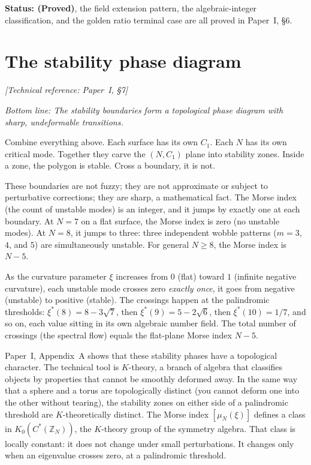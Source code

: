 \textbf{Status: (Proved)}, the field extension pattern, the
algebraic-integer classification, and the golden ratio terminal case
are all proved in Paper~I, \S6.


\section{The stability phase diagram}
\noindent\textit{[Technical reference: Paper~I, \S7]}

\medskip

\noindent\textit{Bottom line: The stability boundaries form a
topological phase diagram with sharp, undeformable transitions.}

\medskip

Combine everything above. Each surface has its own $C_1$. Each $N$
has its own critical mode. Together they carve the $(N, C_1)$ plane
into stability zones. Inside a zone, the polygon is stable. Cross a
boundary, it is not.

These boundaries are not fuzzy; they are not approximate or subject
to perturbative corrections; they are sharp, a mathematical fact.
The Morse index (the count of unstable modes) is an integer, and it
jumps by exactly one at each boundary. At $N = 7$ on a flat surface, the
Morse index is zero (no unstable modes). At $N = 8$, it jumps to
three: three independent wobble patterns ($m = 3$, $4$, and $5$) are
simultaneously unstable. For general $N \ge 8$, the Morse index is
$N - 5$.

As the curvature parameter $\xi$ increases from $0$ (flat) toward $1$
(infinite negative curvature), each unstable mode crosses zero
\emph{exactly once}, it goes from negative (unstable) to positive
(stable). The crossings happen at the palindromic thresholds:
$\xi^*(8) = 8 - 3\sqrt{7}$, then $\xi^*(9) = 5 - 2\sqrt{6}$, then
$\xi^*(10) = 1/7$, and so on, each value sitting in its own algebraic
number field. The total number of crossings (the spectral flow) equals
the flat-plane Morse index $N - 5$.

Paper~I, Appendix~A shows that these stability phases have a
topological character. The technical tool is $K$-theory, a branch of
algebra that classifies objects by properties that cannot be smoothly
deformed away. In the same way that a sphere and a torus are
topologically distinct (you cannot deform one into the other without
tearing), the stability zones on either side of a palindromic
threshold are $K$-theoretically distinct. The Morse index
$[\mu_N(\xi)]$ defines a class in $K_0(C^*(\mathbb{Z}_N))$, the
$K$-theory group of the symmetry algebra. That class is locally
constant: it does not change under small perturbations. It changes
only when an eigenvalue crosses zero, at a palindromic threshold.

